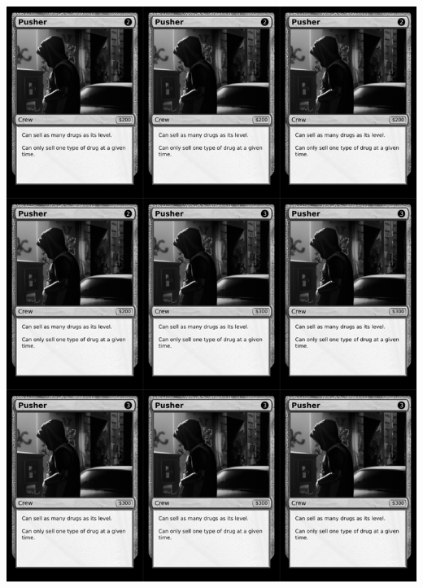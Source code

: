 \documentclass[a4paper]{article}
\begin{document}
\newpage

\begin{center}
	\centering
	\includegraphics[width=200.5mm,height=280.7mm]{output/temp/page10.png}
\end{center}
\end{document}
